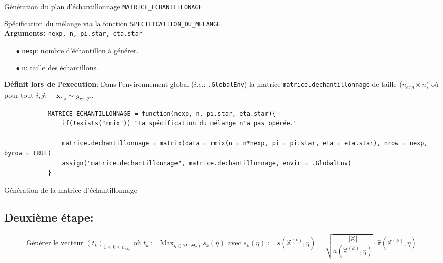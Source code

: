 \documentclass{article}
\newenvironment{fonction}[1][htb]
  {\renewcommand{\algorithmcfname}{Fonction}%
   \begin{algorithm}[#1]%
  }{\end{algorithm}}
\begin{document}
    \begin{fonction}
        \caption{Génération du plan d'échantillonnage \texttt{MATRICE\_ECHANTILLONAGE}}
        \Apriori Spécification du mélange via la fonction \texttt{SPECIFICATIION\_DU\_MELANGE}. \\
        \vspace*{0.2cm}
        \textbf{Arguments:} \texttt{nexp, n, pi.star, eta.star}
        \begin{itemize}
            \item[$\bullet$] \texttt{nexp}: nombre d'échantillon à générer.
            \item[$\bullet$] \texttt{n}: taille des échantillons.
        \end{itemize}
        \vspace*{0.2cm}
        \textbf{Définit lors de l'execution}: Dans l'environnement global ($i.e.$: \texttt{.GlobalEnv}) la matrice \texttt{matrice.dechantillonnage} de taille ($n_{exp}\times{}n$) où pour tout $i,j$: $\quad\mathbf{x}_{i,j}\sim{}g_{\pi^\star,\theta^\star}$.
    \end{fonction}
    \begin{script}[h]
        \begin{verbatim}
            MATRICE_ECHANTILLONNAGE = function(nexp, n, pi.star, eta.star){
                if(!exists("rmix")) "La spécification du mélange n'a pas opérée."
  
                matrice.dechantillonnage = matrix(data = rmix(n = n*nexp, pi = pi.star, eta = eta.star), nrow = nexp, byrow = TRUE)
                assign("matrice.dechantillonnage", matrice.dechantillonnage, envir = .GlobalEnv)
            }
        \end{verbatim}
    \caption{Génération de la matrice d'échantillonnage}
    \end{script}

    \newpage

    \subsection{Deuxième étape: }

    $$ \mbox{Générer le vecteur } (t_k)_{1\leq k\leq n_{exp}} \mbox{ où } t_k := \textrm{Max}_{\eta\in\mathcal{D}(\Theta_2)}\, s_k(\eta) \mbox{ avec } s_k(\eta) := s(\mathbb{X}^{(k)},\eta) = \sqrt{\dfrac{|\mathbb{X}|}{a(\mathbb{X}^{(k)},\eta)}}\cdot\hat\pi(\mathbb{X}^{(k)},\eta)$$
\end{document}
